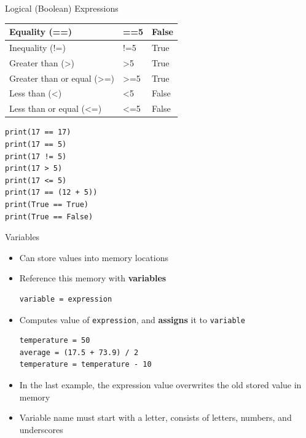 \begin{frame}[fragile]{Logical (Boolean) Expressions}
  \begin{center}
  \begin{tabular}{|l|l|l|}\hline
    Equality ({\ttfamily ==}) & {\ttfamily 17==5} & {\ttfamily False} \\\hline
    Inequality ({\ttfamily !=}) & {\ttfamily 17!=5} & {\ttfamily True}\\\hline
    Greater than ({\ttfamily >}) & {\ttfamily 17>5} & {\ttfamily True}\\\hline
    Greater than or equal ({\ttfamily >=}) & {\ttfamily 17>=5} & {\ttfamily True}\\\hline
    Less than ({\ttfamily <}) & {\ttfamily 17<5} & {\ttfamily False}\\\hline
    Less than or equal ({\ttfamily <=}) & {\ttfamily 17<=5} & {\ttfamily False}\\\hline
  \end{tabular}
\end{center}

\begin{lstlisting}
print(17 == 17)
print(17 == 5)
print(17 != 5)
print(17 > 5)
print(17 <= 5)
print(17 == (12 + 5))
print(True == True)
print(True == False)
\end{lstlisting}
\end{frame}

\begin{frame}[fragile]{Variables}
  \begin{itemize}
    \item Can store values into memory locations
    \item Reference this memory with \textbf{variables}
\begin{lstlisting}
variable = expression
\end{lstlisting}
    \item Computes value of \texttt{expression}, and \textbf{assigns} it to \texttt{variable}
\begin{lstlisting}
temperature = 50
average = (17.5 + 73.9) / 2
temperature = temperature - 10
\end{lstlisting}
\item In the last example, the expression value overwrites the old stored value in memory
\item Variable name must start with a letter, consists of letters, numbers, and underscores
  \end{itemize}
\end{frame}

